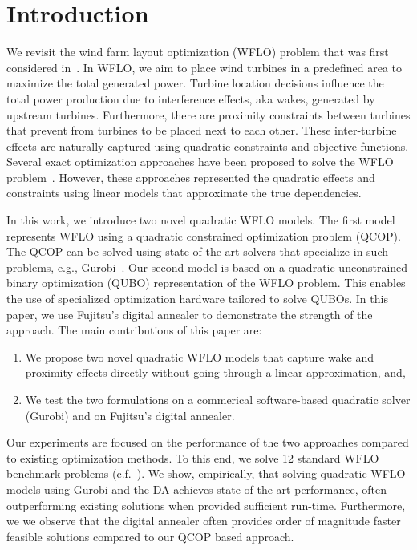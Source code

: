\documentclass[preprint,12pt]{elsarticle}
\begin{document}
\maketitle 

\section{Introduction}

We revisit 
the wind farm layout optimization (WFLO) problem 
that was first considered 
in~\citet{MOSETTI1994105}. 
In WFLO, we aim to place wind turbines 
in a predefined area to maximize 
the total generated power. 
Turbine location decisions    
influence
the
total power production due to  
interference effects, aka wakes, generated by upstream 
turbines. Furthermore, 
there are proximity constraints between turbines
that prevent from turbines to be placed next to each other.
These inter-turbine effects 
are naturally captured using quadratic constraints and objective
functions. Several exact optimization approaches have 
been proposed to solve
the WFLO problem~\cite{turner2014new,Zhang2014}. However, these
approaches represented the quadratic effects and constraints
using linear models that approximate the true dependencies. 

In this work, we introduce two 
novel quadratic WFLO models. The first model 
represents WFLO using a 
quadratic constrained optimization problem (QCOP). 
The QCOP can be solved using state-of-the-art solvers that
specialize in such problems, e.g., Gurobi~\cite{guorbi}. 
Our second model is based on a quadratic unconstrained binary optimization (QUBO) representation of the WFLO 
problem.
This enables the use of specialized optimization hardware tailored to solve
QUBOs. In this paper, we use Fujitsu's digital annealer to demonstrate the strength
of the approach. The main contributions of this paper are: 
\begin{enumerate} 
\item We propose two novel quadratic WFLO models that capture wake and proximity
effects directly without going through a linear approximation, and, 
\item We test the two formulations
on a commerical software-based quadratic solver (Gurobi) and on Fujitsu's digital 
annealer. 
\end{enumerate} Our experiments are focused on the performance of the two approaches
compared to 
existing optimization methods. To this end,
we solve 12 standard WFLO benchmark problems (c.f.~\cite{turner2014new}). 
We show, empirically, that solving quadratic WFLO models
using Gurobi and the DA
achieves state-of-the-art performance, often outperforming
existing solutions when provided sufficient run-time. Furthermore, we
we observe that the digital 
annealer often provides order of magnitude faster feasible solutions
compared to our QCOP based approach.
\end{document}

